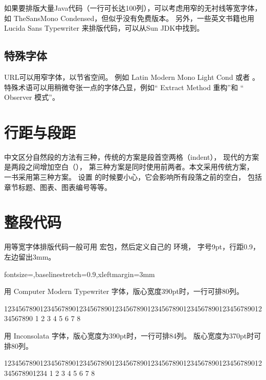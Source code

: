 如果要排版大量Java代码（一行可长达100列），可以考虑用窄的无衬线等宽字体，
如 TheSansMono Condensed，但似乎没有免费版本。
另外，一些英文书籍也用 Lucida Sans Typewriter 来排版代码，可以从Sun JDK中找到。

\subsection{特殊字体}
URL可以用窄字体，以节省空间。
例如 { Latin Modern Mono Light Cond} 或者 。
特殊术语可以用稍微夸张一点的字体凸显，例如“{ Extract Method} 重构”和
“{ Observer} 模式”。

\section{行距与段距}
中文区分自然段的方法有三种，传统的方案是段首空两格（indent），
现代的方案是两段之间增加空白（），
第三种方案是同时使用前两者。本文采用传统方案，
\mybooktitle 一书采用第三种方案。
设置 的时候要小心，它会影响所有段落之前的空白，
包括章节标题、图表、图表编号等等。


\section{整段代码}
用等宽字体排版代码一般可用  宏包，然后定义自己的 环境，
字号9pt，行距0.9，左边留出3mm。
\begin{Code}
%
  {fontsize=\small,baselinestretch=0.9,xleftmargin=3mm}
\end{Code}

用 { Computer Modern Typewriter} 字体，版心宽度390pt时，一行可排80列。
\begin{Code}
12345678901234567890123456789012345678901234567890123456789012345678901234567890
         1         2         3         4         5         6         7         8
\end{Code}

用 { Inconsolata} 字体，版心宽度为390pt时，一行可排84列。
版心宽度为370pt时可排80列。
\makeatletter
{}
\makeatother
\begin{Code}[fontfamily=inconsolata]
123456789012345678901234567890123456789012345678901234567890123456789012345678901234
         1         2         3         4         5         6         7         8
\end{Code}

